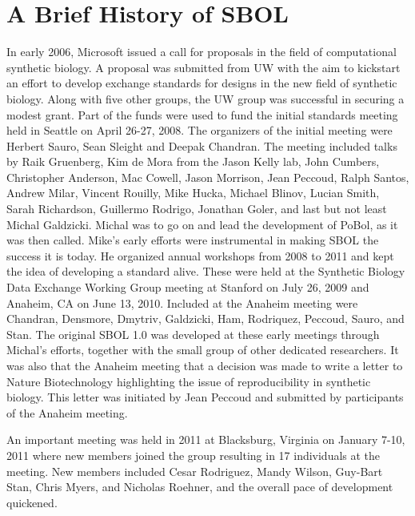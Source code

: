 \section{A Brief History of SBOL}


In early 2006, Microsoft issued a call for proposals in the field of computational synthetic biology. A proposal was submitted from UW with the aim to kickstart an effort to develop exchange standards for designs in the new field of synthetic biology. Along with five other groups, the UW group was successful in securing a modest grant. 
Part of the funds were used to fund the initial standards meeting held in Seattle on April 26-27, 2008. 
The organizers of the initial meeting were Herbert Sauro, Sean Sleight and Deepak Chandran. 
The meeting included talks by Raik Gruenberg,  Kim de Mora from the Jason Kelly lab, John Cumbers,  Christopher Anderson, Mac Cowell, Jason Morrison, Jean Peccoud, Ralph Santos, Andrew Milar, Vincent Rouilly, Mike Hucka, Michael Blinov, Lucian Smith, Sarah Richardson, Guillermo Rodrigo, Jonathan Goler, and last but not least Michal Galdzicki. 
Michal was to go on and lead the development of PoBol, as it was then called. Mike's early efforts were instrumental in making SBOL the success it is today. He organized annual workshops from 2008 to 2011 and kept the idea of developing a standard alive. 
These were held at the Synthetic Biology Data Exchange Working Group meeting at Stanford on July 26, 2009 and Anaheim, CA on June 13, 2010. 
Included at the Anaheim meeting were Chandran, Densmore, Dmytriv, Galdzicki, Ham, Rodriquez, Peccoud, Sauro, and Stan. 
The original SBOL 1.0 was developed at these early meetings through Michal's efforts, together with the small group of other dedicated researchers. 
It was also that the Anaheim meeting that a decision was made to write a letter to Nature Biotechnology highlighting the issue of reproducibility in synthetic biology. This letter was initiated by Jean Peccoud and submitted by participants of the Anaheim meeting. 

An important meeting was held in 2011 at Blacksburg, Virginia on January 7-10, 2011 where new members joined the group resulting in 17 individuals at the meeting. New members included Cesar Rodriguez, Mandy Wilson, Guy-Bart Stan, Chris Myers, and Nicholas Roehner, and the overall pace of development quickened. 

